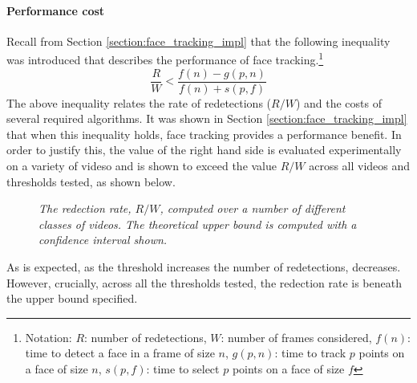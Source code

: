 \paragraph{Performance cost}
Recall from Section \ref{section:face_tracking_impl} that the following inequality was introduced that describes the performance of face tracking.\footnote{Notation: $R$: number of redetections, $W$: number of frames considered, $f(n)$: time to detect a face in a frame of size $n$, $g(p,n)$: time to track $p$ points on a face of size $n$, $s(p,f)$: time to select $p$ points on a face of size $f$}
\begin{equation*}
    \frac{R}{W} < \frac{f(n)-g(p,n)}{f(n)+s(p,f)}
\end{equation*}
The above inequality relates the rate of redetections ($R/W$) and the costs of several required algorithms. It was shown in Section \ref{section:face_tracking_impl} that when this inequality holds, face tracking provides a performance benefit.
In order to justify this, the value of the right hand side is evaluated experimentally on a variety of videso and is shown to exceed the value $R/W$ across all videos and thresholds tested, as shown below.
\begin{figure}[H]
    \centering
    \scalebox{0.8}{}
   \caption{\textit{The redection rate, $R/W$, computed over a number of different classes of videos. The theoretical upper bound is computed with a confidence interval shown.}} 
\end{figure}
As is expected, as the threshold increases the number of redetections, decreases. However, crucially, across all the thresholds tested, the redection rate is beneath the upper bound specified.




